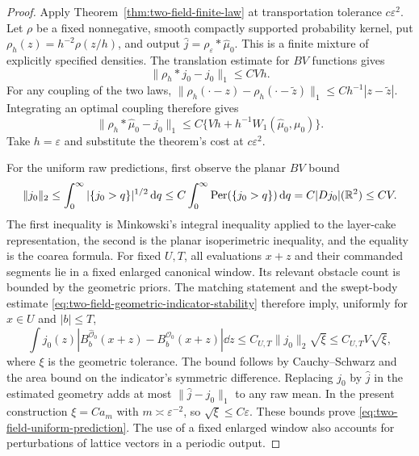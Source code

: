 \begin{proof}
Apply Theorem~\ref{thm:two-field-finite-law} at transportation
tolerance $c\varepsilon^2$.  Let $\rho$ be a fixed nonnegative,
smooth compactly supported probability kernel, put
$\rho_h(z)=h^{-2}\rho(z/h)$, and output
$\widehat j=\rho_\varepsilon*\widehat\mu_0$.
This is a finite mixture of explicitly specified densities.
The translation estimate for $BV$ functions gives
\[
 \|\rho_h*j_0-j_0\|_1\le CVh.
\]
For any coupling of the two laws,
$\|\rho_h(\cdot-z)-\rho_h(\cdot-\widetilde z)\|_1
\le C h^{-1}|z-\widetilde z|$.
Integrating an optimal coupling therefore gives
\[
 \|\rho_h*\widehat\mu_0-j_0\|_1
          \le C\{Vh+h^{-1}W_1(\widehat\mu_0,\mu_0)\}.
\]
Take $h=\varepsilon$ and substitute the theorem's cost at
$c\varepsilon^2$.

For the uniform raw predictions, first observe the planar $BV$
bound
\[
 \|j_0\|_2
 \le\int_0^\infty |\{j_0>q\}|^{1/2}\,\mathrm d q
 \le C\int_0^\infty\operatorname{Per}(\{j_0>q\})\,\mathrm d q
 =C|Dj_0|(\mathbb R^2)\le CV.
\]
The first inequality is Minkowski's integral inequality applied to
the layer-cake representation, the second is the planar
isoperimetric inequality, and the equality is the coarea formula.
For fixed $U,T$, all evaluations $x+z$ and their commanded segments
lie in a fixed enlarged canonical window.  Its relevant obstacle
count is bounded by the geometric priors.  The matching statement
and the swept-body estimate
\eqref{eq:two-field-geometric-indicator-stability} therefore imply,
uniformly for $x\in U$ and $|b|\le T$,
\[
 \int j_0(z)
  |B_b^{\widehat{\mathcal O}_0}(x+z)
       -B_b^{\mathcal O_0}(x+z)|\dd z
                 \le C_{U,T}\|j_0\|_2\sqrt\xi
                 \le C_{U,T}V\sqrt\xi,
\]
where $\xi$ is the geometric tolerance.  The bound follows by
Cauchy--Schwarz and the area bound on the indicator's symmetric
difference.  Replacing $j_0$ by $\widehat j$ in the estimated
geometry adds at most $\|\widehat j-j_0\|_1$ to any raw mean.
In the present construction $\xi=Ca_m$ with
$m\asymp\varepsilon^{-2}$, so $\sqrt\xi\le C\varepsilon$.
These bounds prove \eqref{eq:two-field-uniform-prediction}.
The use of a fixed enlarged window also accounts for perturbations
of lattice vectors in a periodic output.
\end{proof}
